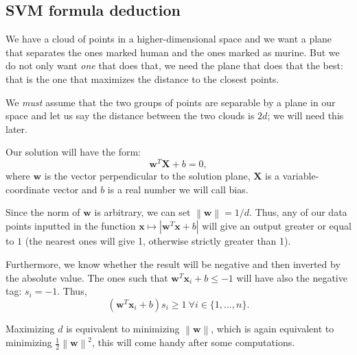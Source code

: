 \subsection*{SVM formula deduction}
\label{sec:svm_formula}

We have a cloud of points in a higher-dimensional space and we want a plane that separates the ones marked human and the ones marked as murine\futnotetext{}. But we do not only want \emph{one} that does that, we need the plane that does that the best: that is the one that maximizes the distance to the closest points.

We \emph{must} assume that the two groups of points are separable by a plane in our space and let us say the distance\futnotetext{} between the two clouds is $2d$; we will need this later.

Our solution will have the form:
\begin{equation*}
    \bm w^T \bm X + b = 0,
\end{equation*}
where $\bm w$ is the vector perpendicular to the solution plane, $\bm X$ is a variable-coordinate vector and $b$ is a real number we will call bias.

Since the norm of $\bm w$ is arbitrary, we can set $\left\| \bm w \right\|=  1/d$. Thus, any of our data points inputted in the function $\bm{x}\mapsto \left|   \bm w^T \bm{x}+b\right|  $ will give an output greater or equal to $1$ (the nearest ones will give 1, otherwise strictly greater than 1).\futnotetext{}

Furthermore, we know whether the result will be negative and then inverted by the absolute value. The ones such that \(\bm w^T \bm{x}_i+b\le -1\) will have also the negative tag: $s_i=-1$. Thus, $$\left(   \bm w^T \bm{x}_i+b\right)s_i \ge 1\ \forall i\in\{1,\dots,n\}.$$

Maximizing $d$ is equivalent to minimizing $\left\| \bm w \right\|$, which is again equivalent to minimizing \(\frac{1}{2}\left\| \bm w \right\| ^2\), this will come handy after some computations.


